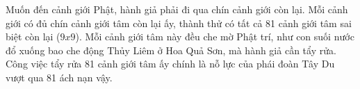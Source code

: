 Muốn đến cảnh giới Phật, hành giả phải đi qua chín cảnh giới còn lại. Mỗi cảnh giới có đủ chín cảnh giới tâm còn lại ấy, thành thử có tất cả 81 cảnh giới tâm sai biệt còn lại ($9 x 9$). Mỗi cảnh giới tâm này đều che mờ Phật trí, như con suối nước đổ xuống bao che động Thủy Liêm ở Hoa Quả Sơn, mà hành giả cần tẩy rửa. Công việc tẩy rửa 81 cảnh giới tâm ấy chính là nỗ lực của phái đoàn Tây Du vượt qua 81 ách nạn vậy.
